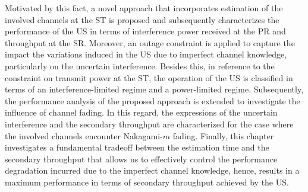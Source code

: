 Motivated by this fact, a novel approach that incorporates estimation of the involved channels at the ST is proposed and subsequently characterizes the performance of the US in terms of interference power received at the PR and throughput at the SR. Moreover, an outage constraint is applied to capture the impact the variations induced in the US due to imperfect channel knowledge, particularly on the uncertain interference. 
Besides this, in reference to the constraint on transmit power at the ST, the operation of the US is classified in terms of an interference-limited regime and a power-limited regime. Subsequently, the performance analysis of the proposed approach is extended to investigate the influence of channel fading. In this regard, the expressions of the uncertain interference and the secondary throughput are characterized for the case where the involved channels encounter Nakagami-$m$ fading. Finally, this chapter investigates a fundamental tradeoff between the estimation time and the secondary throughput that allows us to effectively control the performance degradation incurred due to the imperfect channel knowledge, hence, results in a maximum performance in terms of secondary throughput achieved by the US.  


